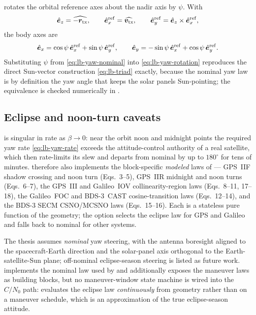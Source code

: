  rotates the orbital reference axes
about the nadir axis by $\psi$.  With
\begin{equation}
  \hat{\bm{e}}_z = \widehat{-\bm{r}_\mathrm{tx}},
  \qquad
  \hat{\bm{e}}_x^{\mathrm{ref}} = \widehat{\bm{v}_\mathrm{tx}},
  \qquad
  \hat{\bm{e}}_y^{\mathrm{ref}} = \hat{\bm{e}}_z \times \hat{\bm{e}}_x^{\mathrm{ref}},
  \label{eq:lb-orbital-ref}
\end{equation}
the body axes are
\begin{equation}
  \hat{\bm{e}}_x
  = \cos\psi\,\hat{\bm{e}}_x^{\mathrm{ref}}
  + \sin\psi\,\hat{\bm{e}}_y^{\mathrm{ref}},
  \qquad
  \hat{\bm{e}}_y
  = -\sin\psi\,\hat{\bm{e}}_x^{\mathrm{ref}}
  + \cos\psi\,\hat{\bm{e}}_y^{\mathrm{ref}}.
  \label{eq:lb-yaw-rotation}
\end{equation}
Substituting $\psi$ from \cref{eq:lb-yaw-nominal} into
\cref{eq:lb-yaw-rotation} reproduces the direct Sun-vector construction
\eqref{eq:lb-triad} exactly, because the nominal yaw law is by definition the
yaw angle that keeps the solar panels Sun-pointing; the equivalence is checked
numerically in .

\subsection{Eclipse and noon-turn caveats}
\label{sec:lb-yaw-eclipse}

 is singular in rate as $\beta \to 0$: near the orbit
noon and midnight points the required yaw rate \eqref{eq:lb-yaw-rate} exceeds
the attitude-control authority of a real satellite, which then rate-limits its
slew and departs from nominal by up to $180^\circ$ for tens of minutes.
 therefore also implements the block-specific
\emph{modeled} laws of \citet{cheng2025yaw} --- GPS~IIF shadow crossing and
noon turn (Eqs.~3--5), GPS~IIR midnight and noon turns (Eqs.~6--7), the
GPS~III and Galileo~IOV collinearity-region laws (Eqs.~8--11, 17--18), the
Galileo~FOC and BDS-3~CAST cosine-transition laws (Eqs.~12--14), and the BDS-3
SECM CSNO/MCSNO laws (Eqs.~15--16).  Each is a stateless pure function of the
geometry; the  option selects the eclipse law for
GPS and Galileo and falls back to nominal for other systems.

\begin{lupntnote}
The thesis \citep[Ch.~6.4.3]{iiyama2026thesis} assumes \emph{nominal} yaw
steering, with the antenna boresight aligned to the spacecraft-Earth direction
and the solar-panel axis orthogonal to the Earth-satellite-Sun plane;
off-nominal eclipse-season steering is listed as future work.  \lupnt{}
implements the nominal law used by  and additionally exposes
the maneuver laws as building blocks, but no maneuver-window state machine is
wired into the $C/N_0$ path:  evaluates the
eclipse law \emph{continuously} from geometry rather than on a maneuver
schedule, which is an approximation of the true eclipse-season attitude.
\end{lupntnote}

